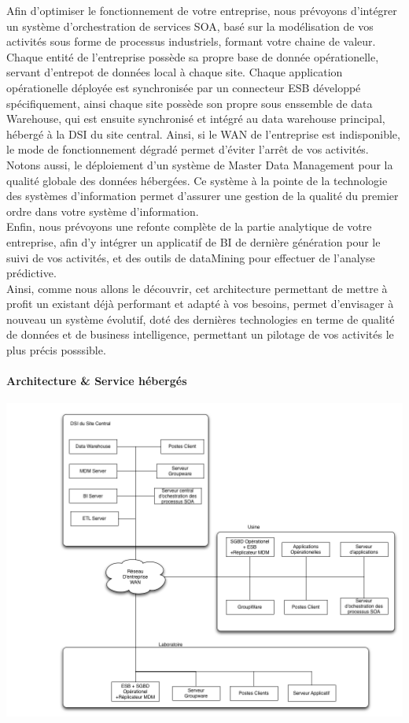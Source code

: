 Afin d'optimiser le fonctionnement de votre entreprise, nous prévoyons d'intégrer un système d'orchestration de services SOA, basé sur la modélisation de vos activités sous forme de processus industriels, formant votre chaine de valeur.\\
Chaque entité de l'entreprise possède sa propre base de donnée opérationelle, servant d'entrepot de données local à chaque site. Chaque application opérationelle déployée est synchronisée par un connecteur ESB développé spécifiquement, ainsi chaque site possède son propre sous enssemble de data Warehouse, qui est ensuite synchronisé et intégré au data warehouse principal, hébergé à la DSI du site central. Ainsi, si le WAN de l'entreprise est indisponible, le mode de fonctionnement dégradé permet d'éviter l'arrêt de vos activités.\\
Notons aussi, le déploiement d'un système de Master Data Management pour la qualité globale des données hébergées. Ce système à la pointe de la technologie des systèmes d'information permet d'assurer une gestion de la qualité du premier ordre dans votre système d'information.\\
Enfin, nous prévoyons une refonte complète de la partie analytique de votre entreprise, afin d'y intégrer un applicatif de BI de dernière génération pour le suivi de vos activités, et des outils de dataMining pour effectuer de l'analyse prédictive.\\

Ainsi, comme nous allons le découvrir, cet architecture permettant de mettre  à profit un existant déjà performant et adapté à vos besoins, permet d'envisager à nouveau un système évolutif, doté des dernières technologies en terme de qualité de données et de business intelligence, permettant un pilotage de vos activités le plus précis posssible.\\

\paragraph{Architecture \& Service hébergés}

\includegraphics[scale=0.2]{DiagrameSOAPdc4.png}

